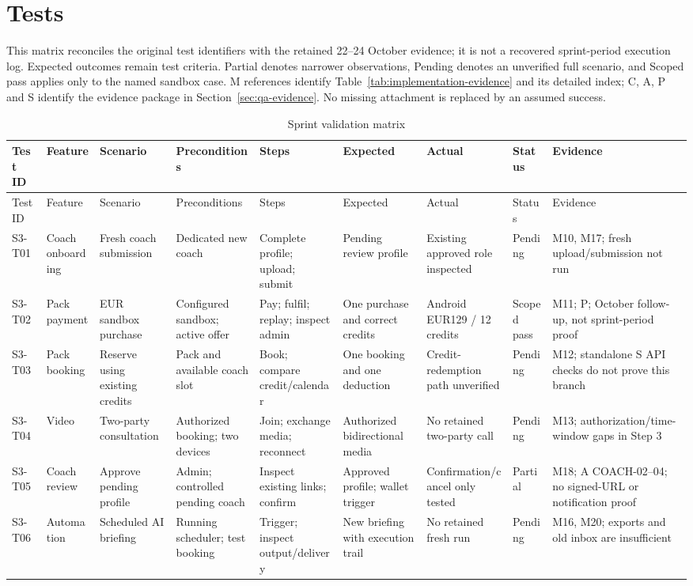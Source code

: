 \documentclass[12pt,a4paper,openany]{report}
\begin{document}
\section{Tests}

This matrix reconciles the original test identifiers with the retained 22--24 October evidence; it is not a recovered sprint-period execution log. Expected outcomes remain test criteria. Partial denotes narrower observations, Pending denotes an unverified full scenario, and Scoped pass applies only to the named sandbox case. M references identify Table~\ref{tab:implementation-evidence} and its detailed index; C, A, P and S identify the evidence package in Section~\ref{sec:qa-evidence}. No missing attachment is replaced by an assumed success.


\begingroup
\scriptsize
\setlength{\tabcolsep}{2pt}
\renewcommand{\arraystretch}{1.20}
\setlength{\LTpre}{5pt}
\setlength{\LTpost}{10pt}
\begin{longtable}{|L{1.20cm}|L{1.50cm}|L{1.60cm}|L{1.60cm}|L{1.80cm}|L{1.80cm}|L{1.65cm}|L{1.35cm}|L{2.00cm}|}
\caption{Sprint validation matrix}\label{tab:pdf-85-41} \\
\hline
{}
Test ID & Feature & Scenario & Preconditions & Steps & Expected & Actual & Status & Evidence \\ \hline
\endfirsthead
\hline
{}
Test ID & Feature & Scenario & Preconditions & Steps & Expected & Actual & Status & Evidence \\ \hline
\endhead
S3-T01 & Coach onboarding & Fresh coach submission & Dedicated new coach & Complete profile; upload; submit & Pending review profile & Existing approved role inspected & Pending & M10, M17; fresh upload\slash{}submission not run \\ \hline
S3-T02 & Pack payment & EUR sandbox purchase & Configured sandbox; active offer & Pay; fulfil; replay; inspect admin & One purchase and correct credits & Android EUR129 \slash{} 12 credits & Scoped pass & M11; P; October follow-up, not sprint-period proof \\ \hline
S3-T03 & Pack booking & Reserve using existing credits & Pack and available coach slot & Book; compare credit\slash{}calendar & One booking and one deduction & Credit-redemption path unverified & Pending & M12; standalone S API checks do not prove this branch \\ \hline
S3-T04 & Video & Two-party consultation & Authorized booking; two devices & Join; exchange media; reconnect & Authorized bidirectional media & No retained two-party call & Pending & M13; authorization\slash{}time-window gaps in Step 3 \\ \hline
S3-T05 & Coach review & Approve pending profile & Admin; controlled pending coach & Inspect existing links; confirm & Approved profile; wallet trigger & Confirmation\slash{}cancel only tested & Partial & M18; A COACH-02--04; no signed-URL or notification proof \\ \hline
S3-T06 & Automation & Scheduled AI briefing & Running scheduler; test booking & Trigger; inspect output\slash{}delivery & New briefing with execution trail & No retained fresh run & Pending & M16, M20; exports and old inbox are insufficient \\ \hline
\end{longtable}
\end{document}
